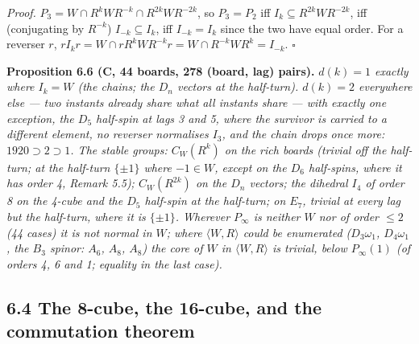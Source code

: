 \documentclass[
]{article}
\begin{document}
\emph{Proof.} \(P_3 = W \cap R^kWR^{-k} \cap R^{2k}WR^{-2k}\), so
\(P_3 = P_2\) iff \(I_k \subseteq R^{2k}WR^{-2k}\), iff (conjugating by
\(R^{-k}\)) \(I_{-k} \subseteq I_k\), iff \(I_{-k} = I_k\) since the two
have equal order. For a reverser \(r\),
\(rI_kr = W \cap rR^kWR^{-k}r = W \cap R^{-k}WR^{k} = I_{-k}\).
\(\square\)

\textbf{Proposition 6.6 (C, 44 boards, 278 (board, lag) pairs).}
\emph{\(d(k) = 1\) exactly where \(I_k = W\) (the chains; the \(D_n\)
vectors at the half-turn). \(d(k) = 2\) everywhere else --- two instants
already share what all instants share --- with exactly one exception,
the \(D_5\) half-spin at lags 3 and 5, where the survivor is carried to
a different element, no reverser normalises \(I_3\), and the chain drops
once more: \(1920 \supset 2 \supset 1\). The stable groups: \(C_W(R^k)\)
on the rich boards (trivial off the half-turn; at the half-turn
\(\{\pm 1\}\) where \(-1 \in W\), except on the \(D_6\) half-spins,
where it has order 4, Remark 5.5); \(C_W(R^{2k})\) on the \(D_n\)
vectors; the dihedral \(I_4\) of order 8 on the 4-cube and the \(D_5\)
half-spin at the half-turn; on \(E_7\), trivial at every lag but the
half-turn, where it is \(\{\pm 1\}\). Wherever \(P_\infty\) is neither
\(W\) nor of order \(\le 2\) (44 cases) it is not normal in \(W\); where
\(\langle W, R \rangle\) could be enumerated (\(D_3\omega_1\),
\(D_4\omega_1\), the \(B_3\) spinor: \(A_6\), \(A_8\), \(A_8\)) the core
of \(W\) in \(\langle W,R\rangle\) is trivial, below \(P_\infty(1)\) (of
orders 4, 6 and 1; equality in the last case).}

\subsection{6.4 The 8-cube, the 16-cube, and the commutation
theorem}\label{the-8-cube-the-16-cube-and-the-commutation-theorem}
\end{document}
